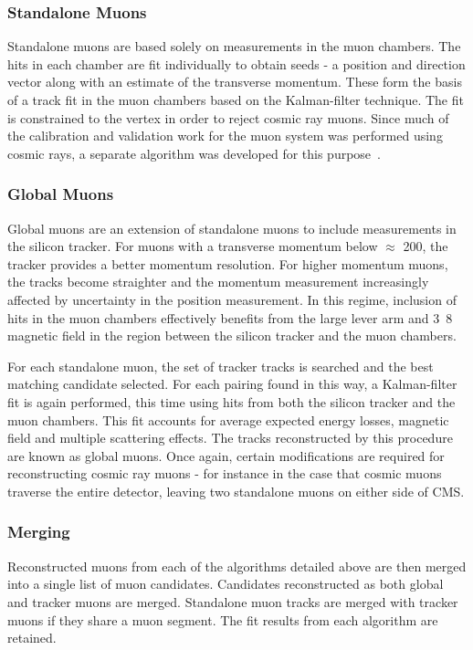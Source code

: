 \subsubsection{Standalone Muons}
Standalone muons are based solely on measurements in the muon chambers. The hits
in each chamber are fit individually to obtain seeds - a position and direction
vector along with an estimate of the transverse momentum. These form the basis
of a track fit in the muon chambers based on the Kalman-filter technique. The
fit is constrained to the vertex in order to reject cosmic ray muons. Since much
of the calibration and validation work for the muon system was performed using
cosmic rays, a separate algorithm was developed for this purpose~\cite{cms_mu_reco_cosmic}.

\subsubsection{Global Muons}
Global muons are an extension of standalone muons to include measurements in the
silicon tracker. For muons with a transverse momentum below $\approx$
\unit{200}{\GeV}, the tracker provides a better momentum resolution. For higher
momentum muons, the tracks become straighter and the momentum measurement
increasingly affected by uncertainty in the position measurement. In this
regime, inclusion of hits in the muon chambers effectively benefits from the
large lever arm and \unit{3.8}{\tesla} magnetic field in the region between the
silicon tracker and the muon chambers.

For each standalone muon, the set of tracker tracks is searched and the best
matching candidate selected. For each pairing found in this way, a Kalman-filter
fit is again performed, this time using hits from both the silicon tracker and
the muon chambers. This fit accounts for average expected energy losses,
magnetic field and multiple scattering effects. The tracks reconstructed by this
procedure are known as global muons. Once again, certain modifications are
required for reconstructing cosmic ray muons - for instance in the case that
cosmic muons traverse the entire detector, leaving two standalone muons on
either side of \ac{CMS}.

\subsubsection{Merging}
Reconstructed muons from each of the algorithms detailed above are then merged
into a single list of muon candidates. Candidates reconstructed as both global
and tracker muons are merged. Standalone muon tracks are merged with tracker
muons if they share a muon segment. The fit results from each algorithm are
retained.

